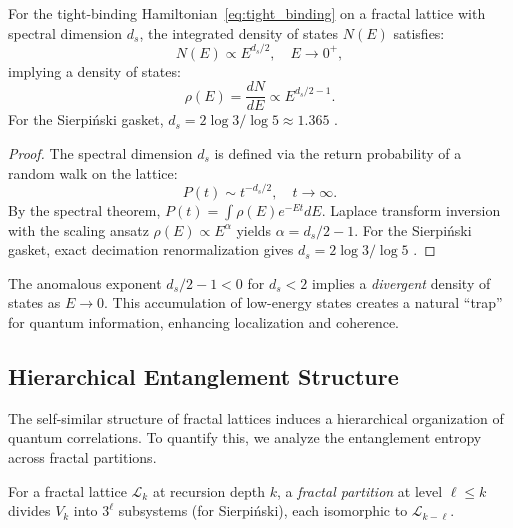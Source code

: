 \begin{proposition}
\label{prop:dos}
For the tight-binding Hamiltonian~\eqref{eq:tight_binding} on a fractal
lattice with spectral dimension $d_s$, the integrated density of states
$N(E)$ satisfies:
\begin{equation}
N(E) \propto E^{d_s/2}, \quad E \to 0^+,
\label{eq:idos}
\end{equation}
implying a density of states:
\begin{equation}
\rho(E) = \frac{dN}{dE} \propto E^{d_s/2 - 1}.
\label{eq:dos}
\end{equation}
For the Sierpi\'{n}ski gasket, $d_s = 2\log 3 / \log 5 \approx 1.365$
\cite{Rammal1984,Alexander1982}.
\end{proposition}

\begin{proof}
The spectral dimension $d_s$ is defined via the return probability of a
random walk on the lattice:
\begin{equation}
P(t) \sim t^{-d_s/2}, \quad t \to \infty.
\end{equation}
By the spectral theorem, $P(t) = \int \rho(E) e^{-Et} dE$. Laplace transform
inversion with the scaling ansatz $\rho(E) \propto E^\alpha$ yields
$\alpha = d_s/2 - 1$. For the Sierpi\'{n}ski gasket, exact decimation
renormalization gives $d_s = 2\log 3 / \log 5$ \cite{Rammal1984}.
\end{proof}

The anomalous exponent $d_s/2 - 1 < 0$ for $d_s < 2$ implies a \emph{divergent}
density of states as $E \to 0$. This accumulation of low-energy states creates
a natural ``trap'' for quantum information, enhancing localization and
coherence.

\subsection{Hierarchical Entanglement Structure}

The self-similar structure of fractal lattices induces a hierarchical
organization of quantum correlations. To quantify this, we analyze the
entanglement entropy across fractal partitions.

\begin{definition}
\label{def:fractal_partition}
For a fractal lattice $\mathcal{L}_k$ at recursion depth $k$, a
\emph{fractal partition} at level $\ell \leq k$ divides $V_k$ into
$3^\ell$ subsystems (for Sierpi\'{n}ski), each isomorphic to
$\mathcal{L}_{k-\ell}$.
\end{definition}

